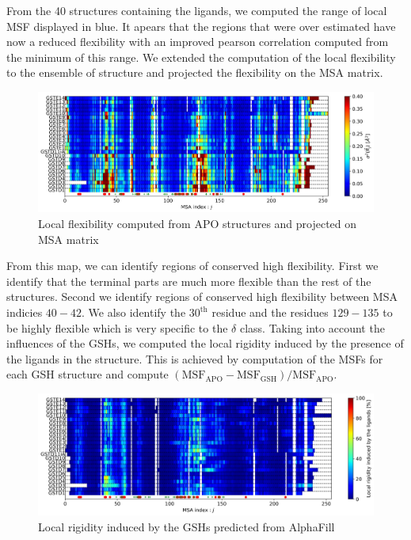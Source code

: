 \noindent From the 40 structures containing the ligands, we computed the range of local MSF displayed in blue. It apears that the regions that were over estimated have now a reduced flexibility with an improved pearson correlation computed from the minimum of this range. We extended the computation of the local flexibility to the ensemble of structure and projected the flexibility on the MSA matrix. 

\begin{figure}[h!]
	\label{ANM-COM + MSA}
	\includegraphics[width = .99\linewidth]{figures/ANM-COM+MSA_APO_MSF.jpg}
	\caption{Local flexibility computed from APO structures and projected on MSA matrix}
\end{figure}

\noindent From this map, we can identify regions of conserved high flexibility. First we identify that the terminal parts are much more flexible than the rest of the structures. Second we identify regions of conserved high flexibility between MSA indicies $40-42$. We also identify the $30^{\text{th}}$ residue and the residues $129-135$ to be highly flexible which is very specific to the $\delta$ class. Taking into account the influences of the GSHs, we computed the local rigidity induced by the presence of the ligands in the structure. This is achieved by computation of the MSFs for each GSH structure and compute $(\text{MSF}_{\text{APO}} - \text{MSF}_{\text{GSH}}) / \text{MSF}_{\text{APO}}$.

\begin{figure}[h!]
	\label{Local rigidity GSHs}
	\includegraphics[width = 16cm]{figures/ANM-COM+MSA_GSHs_influcene_MSF.jpg}
	\caption{Local rigidity induced by the GSHs predicted from AlphaFill}
\end{figure}


